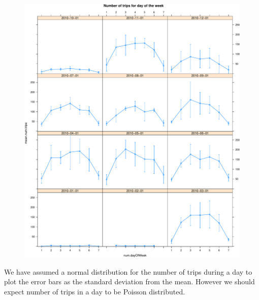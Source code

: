 \documentclass[]{article}
\begin{document}
\begin{figure}[htbp]
\centering
\includegraphics{velopassBirdsEye_files/figure-latex/tripsbydayaggregatemonth-1.pdf}
\caption{}
\end{figure}

We have assumed a normal distribution for the number of trips during a
day to plot the error bars as the standard deviation from the mean.
However we should expect number of trips in a day to be Poisson
distributed.
\end{document}
